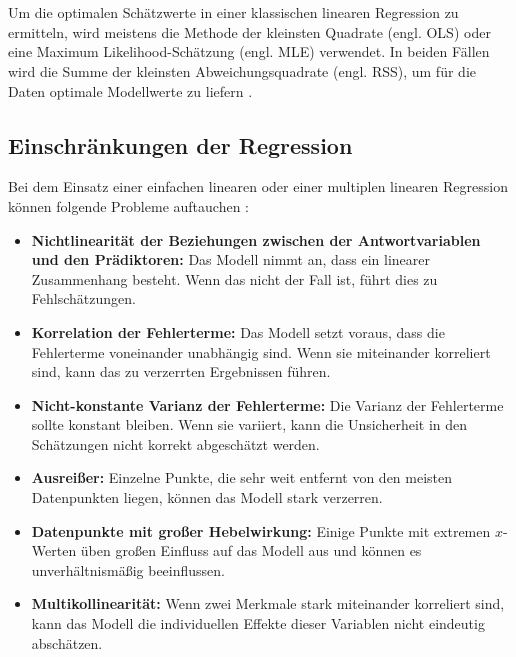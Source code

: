 \\\\
Um die optimalen Schätzwerte in einer klassischen linearen Regression zu ermitteln, wird meistens die Methode der kleinsten Quadrate (engl. \ac{OLS}) oder eine Maximum Likelihood-Schätzung (engl. \ac{MLE}) verwendet. In beiden Fällen wird die Summe der kleinsten Abweichungsquadrate (engl. \ac{RSS}), um für die Daten optimale Modellwerte zu liefern \cite[S. 246]{frick2021data}. 
\subsection{Einschränkungen der Regression}
\label{einschränkungenderregression}
Bei dem Einsatz einer einfachen linearen oder einer multiplen linearen Regression können folgende Probleme auftauchen \cite{james2013introduction}: 
\begin{itemize}
    \item \textbf{Nichtlinearität der Beziehungen zwischen der Antwortvariablen und den Prädiktoren:} Das Modell nimmt an, dass ein linearer Zusammenhang besteht. Wenn das nicht der Fall ist, führt dies zu Fehlschätzungen. 
    \item \textbf{Korrelation der Fehlerterme:} Das Modell setzt voraus, dass die Fehlerterme voneinander unabhängig sind. Wenn sie miteinander korreliert sind, kann das zu verzerrten Ergebnissen führen.
    \item \textbf{Nicht-konstante Varianz der Fehlerterme:} Die Varianz der Fehlerterme sollte konstant bleiben. Wenn sie variiert, kann die Unsicherheit in den Schätzungen nicht korrekt abgeschätzt werden.
    \item \textbf{Ausreißer:} Einzelne Punkte, die sehr weit entfernt von den meisten Datenpunkten liegen, können das Modell stark verzerren.
    \item \textbf{Datenpunkte mit großer Hebelwirkung:} Einige Punkte mit extremen \(x\)-Werten üben großen Einfluss auf das Modell aus und können es unverhältnismäßig beeinflussen.
    \item \textbf{Multikollinearität:} Wenn zwei Merkmale stark miteinander korreliert sind, kann das Modell die individuellen Effekte dieser Variablen nicht eindeutig abschätzen.
\end{itemize}
